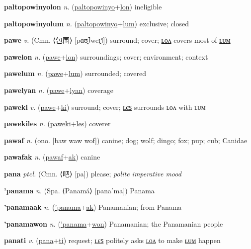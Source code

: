 \textbf{\hypertarget{paltopowinyolon}{paltopowinyolon}} \textit{n.} (\hyperlink{paltopowinyo}{paltopowinyo}+\allowbreak \hyperlink{lon}{lon})
ineligible

\textbf{\hypertarget{paltopowinyolum}{paltopowinyolum}} \textit{n.} (\hyperlink{paltopowinyo}{paltopowinyo}+\allowbreak \hyperlink{lum}{lum})
exclusive; closed

\textbf{\hypertarget{pawe}{pawe}} \textit{v.} (Cmn. ⟨{\chinese{}包围}⟩ [pɑʊ̯˥weɪ̯˧˥])
surround; cover; \hyperlink{pawelon}{ʟᴏᴧ} covers most of \hyperlink{pawelum}{ʟᴜᴍ}

\textbf{\hypertarget{pawelon}{pawelon}} \textit{n.} (\hyperlink{pawe}{pawe}+\allowbreak \hyperlink{lon}{lon})
surroundings; cover; environment; context

\textbf{\hypertarget{pawelum}{pawelum}} \textit{n.} (\hyperlink{pawe}{pawe}+\allowbreak \hyperlink{lum}{lum})
surrounded; covered

\textbf{\hypertarget{pawelyan}{pawelyan}} \textit{n.} (\hyperlink{pawe}{pawe}+\allowbreak \hyperlink{lyan}{lyan})
coverage

\textbf{\hypertarget{paweki}{paweki}} \textit{v.} (\hyperlink{pawe}{pawe}+\allowbreak \hyperlink{ki}{ki})
surround; cover; \hyperlink{pawekiles}{ʟєꜱ} surrounds ʟᴏᴧ with ʟᴜᴍ

\textbf{\hypertarget{pawekiles}{pawekiles}} \textit{n.} (\hyperlink{paweki}{paweki}+\allowbreak \hyperlink{les}{les})
coverer

\textbf{\hypertarget{pawaf}{pawaf}} \textit{n.} (ono. [baw waw wof])
canine; dog; wolf; dingo; fox; pup; cub; Canidae

\textbf{\hypertarget{pawafak}{pawafak}} \textit{n.} (\hyperlink{pawaf}{pawaf}+\allowbreak \hyperlink{ak}{ak})
canine

\textbf{\hypertarget{pana}{pana}} \textit{ptcl.} (Cmn. ⟨{\chinese{}吧}⟩ [pa])
please; \textit{polite imperative mood}

\textbf{\hypertarget{'panama}{'panama}} \textit{n.} (Spa. ⟨Panamá⟩ [panaˈma])
Panama

\textbf{\hypertarget{'panamaak}{'panamaak}} \textit{n.} (\hyperlink{'panama}{'panama}+\allowbreak \hyperlink{ak}{ak})
Panamanian; from Panama

\textbf{\hypertarget{'panamawon}{'panamawon}} \textit{n.} (\hyperlink{'panama}{'panama}+\allowbreak \hyperlink{won}{won})
Panamanian; the Panamanian people

\textbf{\hypertarget{panati}{panati}} \textit{v.} (\hyperlink{pana}{pana}+\allowbreak \hyperlink{ti}{ti})
request; \hyperlink{panatiles}{ʟєꜱ} politely asks \hyperlink{panatilon}{ʟᴏᴧ} to make \hyperlink{panatilum}{ʟᴜᴍ} happen

